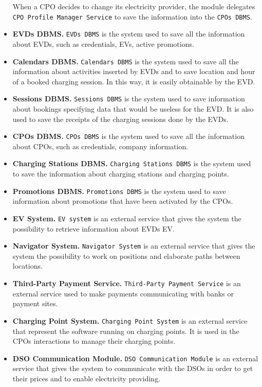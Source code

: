 \begin{itemize}
    When a CPO decides to change its electricity provider, the module delegates \verb|CPO Profile Manager Service| to
    save the information into the \verb|CPOs DBMS|.
    \item \textbf{EVDs DBMS.} \verb|EVDs DBMS| is the system used to save all the information about EVDs, such as
    credentials, EVs, active promotions.
    \item \textbf{Calendars DBMS.} \verb|Calendars DBMS| is the system used to save all the information about activities
    inserted by EVDs and to save location and hour of a booked charging session.
    In this way, it is easily obtainable by the EVD\@.
    \item \textbf{Sessions DBMS.} \verb|Sessions DBMS| is the system used to save information about bookings
    specifying data that would be useless for the EVD.
    It is also used to save the receipts of the charging sessions done by the EVDs.
    \item \textbf{CPOs DBMS.} \verb|CPOs DBMS| is the system used to save all the information about CPOs, such as credentials,
    company information.
    \item \textbf{Charging Stations DBMS.} \verb|Charging Stations DBMS| is the system used to save the information about
    charging stations and charging points.
    \item \textbf{Promotions DBMS.} \verb|Promotions DBMS| is the system used to save information about promotions
    that have been activated by the CPOs.
    \item \textbf{EV System.} \verb|EV system| is an external service that gives the system the possibility to retrieve
    information about EVDs EV\@.
    \item \textbf{Navigator System.} \verb|Navigator System| is an external service that gives the system the possibility
    to work on positions and elaborate paths between locations.
    \item \textbf{Third-Party Payment Service.} \verb|Third-Party Payment Service| is an external service used to
    make payments communicating with banks or payment sites.
    \item \textbf{Charging Point System.} \verb|Charging Point System| is an external service that represent the software
    running on charging points.
    It is used in the CPOs interactions to manage their charging points.
    \item \textbf{DSO Communication Module.} \verb|DSO Communication Module| is an external service that gives the system
    to communicate with the DSOs in order to get their prices and to enable electricity providing.
\end{itemize}


